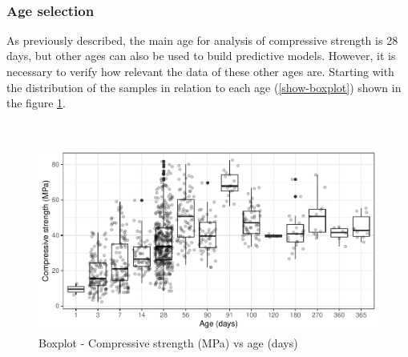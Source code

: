 \documentclass[]{article}
\begin{document}
~

\begin{table}[H]

\caption{\label{tab:similar-samples-same-id}Previous samples after processing}
\centering
{}
\end{table}

\hypertarget{age-selection}{%
\subsubsection{Age selection}\label{age-selection}}

As previously described, the main age for analysis of compressive
strength is 28 days, but other ages can also be used to build predictive
models. However, it is necessary to verify how relevant the data of
these other ages are. Starting with the distribution of the samples in
relation to each age (\ref{show-boxplot}) shown in the figure
\ref{fig:boxplot}.

~

\begin{figure}

{\centering \includegraphics{CopyOfcapstone_files/figure-latex/boxplot-1} 

}

\caption{Boxplot - Compressive strength (MPa) vs age (days)}\label{fig:boxplot}
\end{figure}
\end{document}

